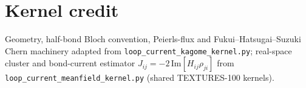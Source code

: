 \documentclass[11pt]{article}
\begin{document}
\section*{Kernel credit}
Geometry, half-bond Bloch convention, Peierls-flux and Fukui--Hatsugai--Suzuki Chern
machinery adapted from \texttt{loop\_current\_kagome\_kernel.py}; real-space cluster and
bond-current estimator $J_{ij}=-2\,\mathrm{Im}[H_{ij}\rho_{ji}]$ from
\texttt{loop\_current\_meanfield\_kernel.py} (shared TEXTURES-100 kernels).
\end{document}
